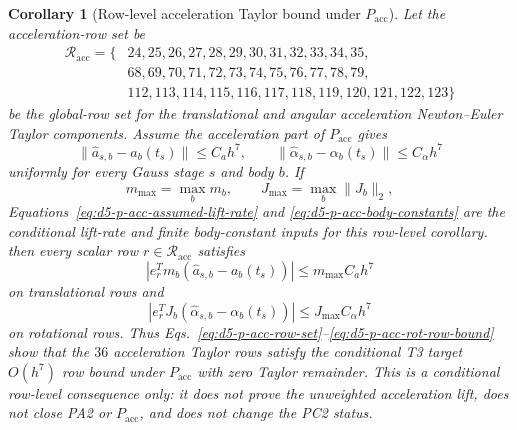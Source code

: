 \documentclass[preprint,12pt]{elsarticle}
\newtheorem{corollary}{Corollary}
\begin{document}
\begin{corollary}[Row-level acceleration Taylor bound under
\(P_{\mathrm{acc}}\)]
\label{cor:d5-p-acc-row-bound-under-pacc}
Let the acceleration-row set be
\begin{equation}
\label{eq:d5-p-acc-row-set}
\begin{aligned}
\mathcal R_{\mathrm{acc}}=\{&
24,25,26,27,28,29,30,31,32,33,34,35,\\
&68,69,70,71,72,73,74,75,76,77,78,79,\\
&112,113,114,115,116,117,118,119,120,121,122,123\}
\end{aligned}
\end{equation}
be the global-row set for the translational and angular acceleration
Newton--Euler Taylor components.  Assume the acceleration part of
\(P_{\mathrm{acc}}\) gives
\begin{equation}
\label{eq:d5-p-acc-assumed-lift-rate}
  \|\widehat a_{s,b}-a_b(t_s)\|\le C_a h^7,\qquad
  \|\widehat\alpha_{s,b}-\alpha_b(t_s)\|\le C_\alpha h^7
\end{equation}
uniformly for every Gauss stage \(s\) and body \(b\).  If
\begin{equation}
\label{eq:d5-p-acc-body-constants}
  m_{\max}=\max_b m_b,\qquad J_{\max}=\max_b\|J_b\|_2,
\end{equation}
Equations~\eqref{eq:d5-p-acc-assumed-lift-rate} and
\eqref{eq:d5-p-acc-body-constants} are the conditional lift-rate and finite
body-constant inputs for this row-level corollary.
then every scalar row \(r\in\mathcal R_{\mathrm{acc}}\) satisfies
\begin{equation}
\label{eq:d5-p-acc-trans-row-bound}
  |e_r^T m_b(\widehat a_{s,b}-a_b(t_s))|
  \le m_{\max}C_a h^7
\end{equation}
on translational rows and
\begin{equation}
\label{eq:d5-p-acc-rot-row-bound}
  |e_r^T J_b(\widehat\alpha_{s,b}-\alpha_b(t_s))|
  \le J_{\max}C_\alpha h^7
\end{equation}
on rotational rows.  Thus Eqs.~\eqref{eq:d5-p-acc-row-set}--\eqref{eq:d5-p-acc-rot-row-bound}
show that the \(36\) acceleration Taylor rows satisfy the conditional T3 target
\(O(h^7)\) row bound under \(P_{\mathrm{acc}}\) with zero Taylor
remainder.  This is a conditional row-level consequence only: it does not
prove the unweighted acceleration lift, does not close PA2 or
\(P_{\mathrm{acc}}\), and does not change the PC2 status.
\end{corollary}
\end{document}
